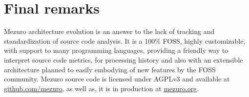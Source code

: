 \section{Final remarks}

Mezuro architecture evolution is an answer to the lack of tracking and
standardization of source code analysis. It is a 100\% FOSS, highly
customizable, with support to many programming languages, providing a friendly
way to interpret source code metrics, for processing history and also with an
extensible architecture planned to easily embodying of new features by the FOSS
community. Mezuro source code is licensed under AGPLv3 and available at
\url{github.com/mezuro}, as well as, it is in production at \url{mezuro.org}.

